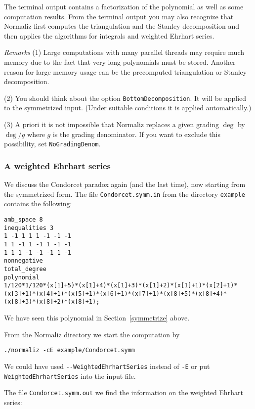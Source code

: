 \documentclass[12pt,a4paper]{scrartcl}
\theoremstyle{definition}
\def\ttt{\texttt}
\begin{document}
The terminal output contains a factorization of the polynomial as well as some computation results. From the terminal output you may also recognize that Normaliz first computes the triangulation and the Stanley decomposition and then applies the algorithms for integrals and weighted Ehrhart series.

\emph{Remarks} \enspace (1) Large computations with many parallel threads may require much memory due to the fact that very long polynomials must be stored. Another reason for large memory usage can be the precomputed triangulation or Stanley decomposition.

(2) You should think about the option \verb|BottomDecomposition|. It will be applied to the symmetrized input. (Under suitable conditions it is applied automatically.)

(3) A priori it is not impossible that Normaliz replaces a given grading $\deg$ by $\deg/g$ where $g$ is the grading denominator. If you want to exclude this possibility, set \verb|NoGradingDenom|.


\subsubsection{A weighted Ehrhart series}

We discuss the Condorcet paradox again (and the last time), now starting from the symmetrized form. The file \ttt{Condorcet.symm.in} from the directory
\ttt{example} contains the following:

\begin{Verbatim}
amb_space 8
inequalities 3
1 -1 1 1 1 -1 -1 -1
1 1 -1 1 -1 1 -1 -1
1 1 1 -1 -1 -1 1 -1
nonnegative
total_degree
polynomial
1/120*1/120*(x[1]+5)*(x[1]+4)*(x[1]+3)*(x[1]+2)*(x[1]+1)*(x[2]+1)*
(x[3]+1)*(x[4]+1)*(x[5]+1)*(x[6]+1)*(x[7]+1)*(x[8]+5)*(x[8]+4)*
(x[8]+3)*(x[8]+2)*(x[8]+1);
\end{Verbatim}
We have seen this polynomial in Section~\ref{symmetrize} above.


From the Normaliz directory we start the computation by
\begin{Verbatim}
./normaliz -cE example/Condorcet.symm
\end{Verbatim}
We could have used \verb|--WeightedEhrhartSeries| instead of \verb|-E| or put \verb|WeightedEhrhartSeries| into the input file.

The file \ttt{Condorcet.symm.out} we find the information on the weighted Ehrhart series:
\end{document}

